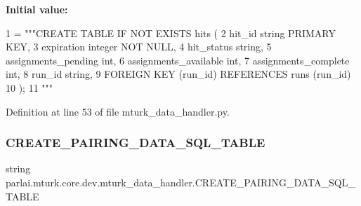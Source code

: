 {\bfseries Initial value\+:}
\begin{DoxyCode}
1 =  \textcolor{stringliteral}{"""CREATE TABLE IF NOT EXISTS hits (}
2 \textcolor{stringliteral}{        hit\_id string PRIMARY KEY,}
3 \textcolor{stringliteral}{        expiration integer NOT NULL,}
4 \textcolor{stringliteral}{        hit\_status string,}
5 \textcolor{stringliteral}{        assignments\_pending int,}
6 \textcolor{stringliteral}{        assignments\_available int,}
7 \textcolor{stringliteral}{        assignments\_complete int,}
8 \textcolor{stringliteral}{        run\_id string,}
9 \textcolor{stringliteral}{        FOREIGN KEY (run\_id) REFERENCES runs (run\_id)}
10 \textcolor{stringliteral}{    );}
11 \textcolor{stringliteral}{    """}
\end{DoxyCode}


Definition at line 53 of file mturk\+\_\+data\+\_\+handler.\+py.

\mbox{\label{namespaceparlai_1_1mturk_1_1core_1_1dev_1_1mturk__data__handler_a47283f5afce715b73965cdc188fde863}} 
\subsubsection{\texorpdfstring{C\+R\+E\+A\+T\+E\+\_\+\+P\+A\+I\+R\+I\+N\+G\+\_\+\+D\+A\+T\+A\+\_\+\+S\+Q\+L\+\_\+\+T\+A\+B\+LE}{CREATE\_PAIRING\_DATA\_SQL\_TABLE}}
{\footnotesize\ttfamily string parlai.\+mturk.\+core.\+dev.\+mturk\+\_\+data\+\_\+handler.\+C\+R\+E\+A\+T\+E\+\_\+\+P\+A\+I\+R\+I\+N\+G\+\_\+\+D\+A\+T\+A\+\_\+\+S\+Q\+L\+\_\+\+T\+A\+B\+LE}

